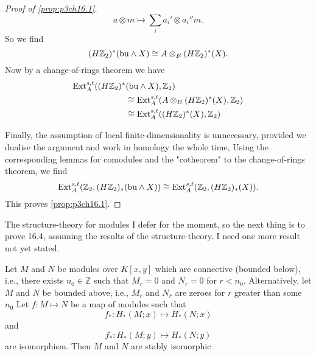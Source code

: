 \documentclass[../main]{subfiles}
\begin{document}
\begin{proof}[Proof of \ref{prop:p3ch16.1}]
\begin{equation*}
    a \otimes m \mapsto \sum_{i}a_{i}'\otimes a_{i}''m.
\end{equation*}
So we find \begin{equation*}
    (H\mathbb{Z}_2)^{\ast}(\mathrm{bu} \wedge X) \cong A \otimes_{B}(H\mathbb{Z}_2)^{\ast}(X).
\end{equation*}
Now by a change-of-rings theorem we have 
\begin{align*}
    \mathrm{Ext}_{A}^{s, t}((H\mathbb{Z}_2)^{\ast}&(\mathrm{bu} \wedge X), \mathbb{Z}_2)\\
    &\cong\mathrm{Ext}_{A}^{s, t}(A \otimes_{B}(H\mathbb{Z}_2)^{\ast}(X), \mathbb{Z}_2)\\
    &\cong \mathrm{Ext}_{A}^{s, t}((H\mathbb{Z}_2)^{\ast}(X), \mathbb{Z}_2)
\end{align*}

Finally, the assumption of local finite-dimensionality is unnecessary, 
provided we dualise the argument and work in homology the whole time, 
Using the corresponding lemmas for comodules and the "cotheorem" to
the change-of-rings theorem, we find \begin{equation*}
    \mathrm{Ext}_{A}^{s, t}(\mathbb{Z}_2, (H\mathbb{Z}_2)_{\ast}(\mathrm{bu} \wedge X)) \cong \mathrm{Ext}_{A}^{s, t}(\mathbb{Z}_2, (H\mathbb{Z}_2)_{\ast}(X)).
\end{equation*}
This proves \ref{prop:p3ch16.1}.
     \end{proof}
     
    The structure-theory for modules I defer for the moment, so the
next thing is to prove 16.4, assuming the results of the structure-theory.
I need one more result not yet stated. 

\begin{lemma} \label{lem:p3ch16.7}
 Let $M$ and $N$ be modules over $K[x, y]$ which are connective (bounded below), i.e., there exists $n_{0} \in \mathbb{Z}$ such that $M_{r}=0$ and $N_{r}=0$ for $r<n_{0}$. Alternatively, let $M$ and $N$ be bounded above, i.e., $M_{r}$ and $N_{r}$ are zeroes for $r$ greater than some $n_{0}$ Let $f:M\mapsto N$ be a map of modules such that \begin{equation*}
     f_{\ast}:H_{\ast}(M;x)\mapsto H_{\ast}(N;x) 
 \end{equation*}
 and \begin{equation*}
      f_{\ast}:H_{\ast}(M;y)\mapsto H_{\ast}(N;y) 
 \end{equation*}
 are isomorphism. Then $M$ and $N$ are stably isomorphic
\end{lemma}
\end{document}

